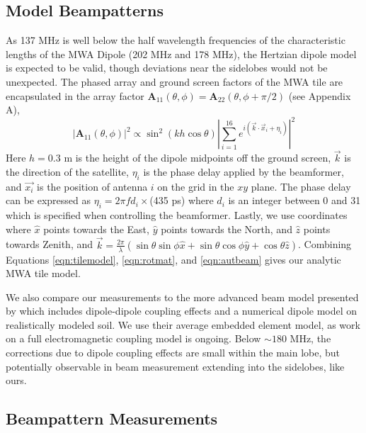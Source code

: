 \subsection{Model Beampatterns}
\label{sec:modelbeampatterns}

As 137 MHz is well below the half wavelength frequencies of the characteristic lengths of the MWA Dipole (202 MHz and 178 MHz), the Hertzian dipole model is expected to be valid, though deviations near the sidelobes would not be unexpected. The phased array and ground screen factors of the MWA tile are encapsulated in the array factor $\textbf{A}_{11}(\theta,\phi)=\textbf{A}_{22}(\theta,\phi+\pi/2)$ (see Appendix A),
\begin{equation}
\label{eqn:tilemodel}
|\textbf{A}_{11}(\theta,\phi)|^2 \propto \sin^2\left(kh\cos\theta\right)\left|\sum_{i=1}^{16}e^{i (\vec{k}\cdot \vec{x}_i+\eta_i)}\right|^2
\end{equation}
Here $h=0.3$ m is the height of the dipole midpoints off the ground screen, $\vec{k}$ is the direction of the satellite, $\eta_i$ is the phase delay applied by the beamformer, and $\vec{x_i}$ is the position of antenna $i$ on the grid in the $xy$ plane. The phase delay can be expressed as $\eta_i=2\pi fd_i\times$(435 ps) where $d_i$ is an integer between 0 and 31 which is specified when controlling the beamformer. Lastly, we use coordinates where $\hat{x}$ points towards the East, $\hat{y}$ points towards the North, and $\hat{z}$ points towards Zenith, and $\vec{k}=\frac{2\pi}{\lambda}(\sin\theta\sin\phi\hat{x}+\sin\theta\cos\phi\hat{y}+\cos\theta\hat{z})$. Combining Equations \ref{eqn:tilemodel}, \ref{eqn:rotmat}, and \ref{eqn:autbeam} gives our analytic MWA tile model. 

We also compare our measurements to the more advanced beam model presented by \citet{sutinjo15} which includes dipole-dipole coupling effects and a numerical dipole model on realistically modeled soil. We use their average embedded element model, as work on a full electromagnetic coupling model is ongoing. Below $\sim180$ MHz, the corrections due to dipole coupling effects are small within the main lobe, but potentially observable in beam measurement extending into the sidelobes, like ours.

\subsection{Beampattern Measurements}

